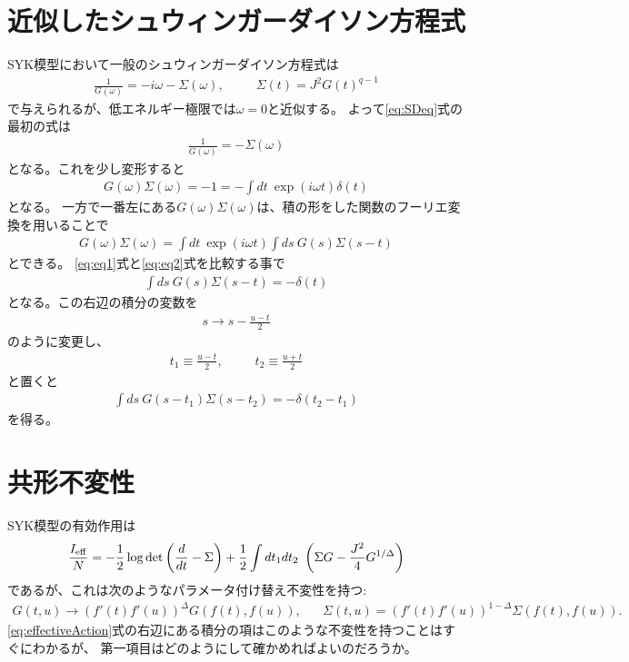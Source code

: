 \documentclass[a4j]{ltjsarticle}
\newcommand{\deriv}{\frac{d}{dt}}
\begin{document}
	\section{近似したシュウィンガーダイソン方程式}
	SYK模型において一般のシュウィンガーダイソン方程式は
	\begin{align}
	\frac{1}{G(\omega)} = -i\omega - \Sigma(\omega),
	\hspace{30pt}
	\Sigma(t) = J^2G(t)^{q-1}
	\label{eq:SDeq}
	\end{align}
	で与えられるが、低エネルギー極限では$\omega = 0$と近似する。
	よって\eqref{eq:SDeq}式の最初の式は
	\begin{align}
	\frac{1}{G(\omega)} = -\Sigma(\omega)
	\end{align}
	となる。これを少し変形すると
	\begin{align}
	G(\omega)\Sigma(\omega) = -1 = -\int dt\ \exp(i\omega t)\delta(t)
	\label{eq:eq1}
	\end{align}
	となる。
	一方で一番左にある$G(\omega)\Sigma(\omega)$は、積の形をした関数のフーリエ変換を用いることで
	\begin{align}
	G(\omega)\Sigma(\omega) = \int dt\ \exp(i\omega t) \int ds\ G(s)\Sigma(s - t)
	\label{eq:eq2}
	\end{align}
	とできる。
	\eqref{eq:eq1}式と\eqref{eq:eq2}式を比較する事で
	\begin{align}
	\int ds\ G(s)\Sigma(s - t) = -\delta(t)
	\end{align}
	となる。この右辺の積分の変数を
	\begin{align}
	s \to s - \frac{u - t}{2}
	\end{align}
	のように変更し、
	\begin{align}
	t_1 \equiv \frac{u - t}{2},
	\hspace{30pt}
	t_2 \equiv \frac{u + t}{2}
	\end{align}
	と置くと
	\begin{align}
	\int ds\ G(s - t_1)\Sigma(s - t_2) = - \delta(t_2 - t_1)
	\label{eq:intOfGSigma}
	\end{align}
	を得る。
	
	\section{共形不変性}
	SYK模型の有効作用は
	\begin{align}
	\frac{I_{\rm eff}}{N} = 
	- \frac{1}{2}\log\det\left(\deriv - \Sigma\right)
	+ \frac{1}{2}\int dt_1dt_2\ \left(\Sigma G - \frac{J^2}{4}G^{1 / \Delta}\right)
	\label{eq:effectiveAction}
	\end{align}
	であるが、これは次のようなパラメータ付け替え不変性を持つ:
	\begin{align}
	G(t, u) \to (f'(t)f'(u))^{\Delta}G(f(t), f(u)),
	\hspace{20pt}
	\Sigma(t, u) = (f'(t)f'(u))^{1 - \Delta}\Sigma(f(t), f(u)).
	\label{eq:reparametrizarion}
	\end{align}
	\eqref{eq:effectiveAction}式の右辺にある積分の項はこのような不変性を持つことはすぐにわかるが、
	第一項目はどのようにして確かめればよいのだろうか。
	
\end{document}
